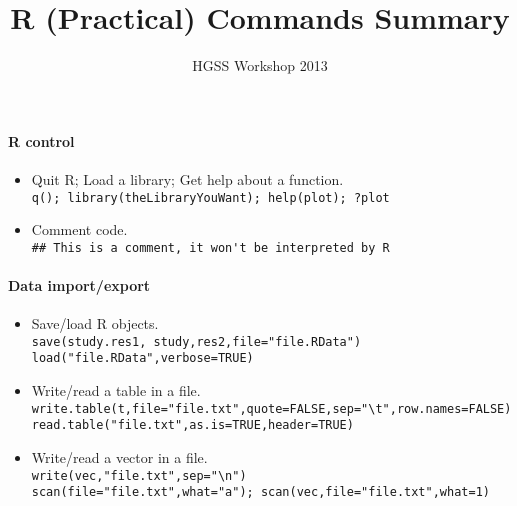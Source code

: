 \documentclass[a4paper,11pt]{article}
\title{R (Practical) Commands Summary}
\author{\tiny HGSS Workshop 2013}
\date{}
\begin{document}
\maketitle

\paragraph{R control}
\begin{itemize} 
  \item Quit R; Load a library; Get help about a function. \\
    \verb!q(); library(theLibraryYouWant); help(plot); ?plot!
  \item Comment code. \\
    \verb!## This is a comment, it won't be interpreted by R!
\end{itemize}

\paragraph{Data import/export}
\begin{itemize} 
  \item Save/load R objects. \\
    \verb!save(study.res1, study,res2,file="file.RData")! \\
    \verb!load("file.RData",verbose=TRUE)!
  \item Write/read a table in a file. \\ 
    \verb!write.table(t,file="file.txt",quote=FALSE,sep="\t",row.names=FALSE)! \\
    \verb!read.table("file.txt",as.is=TRUE,header=TRUE)! 
  \item Write/read a vector in a file. \\ 
    \verb!write(vec,"file.txt",sep="\n")! \\
    \verb!scan(file="file.txt",what="a"); scan(vec,file="file.txt",what=1)!
\end{itemize}


\end{document}
